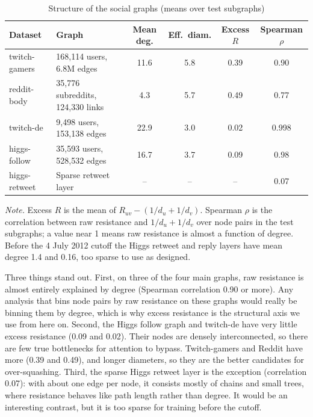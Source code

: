 \begin{table}[htbp]
\caption{Structure of the social graphs (means over test subgraphs)}
\label{tab:s0}
\centering\small
\begin{tabular}{@{}L{1.1in}L{1.45in}cccc@{}}
\toprule
Dataset & Graph & Mean deg. & Eff.\ diam. & Excess $R$ & Spearman $\rho$ \\
\midrule
twitch-gamers & 168,114 users, 6.8M edges & 11.6 & 5.8 & 0.39 & 0.90 \\
reddit-body & 35,776 subreddits, 124,330 links & 4.3 & 5.7 & 0.49 & 0.77 \\
twitch-de & 9,498 users, 153,138 edges & 22.9 & 3.0 & 0.02 & 0.998 \\
higgs-follow & 35,593 users, 528,532 edges & 16.7 & 3.7 & 0.09 & 0.98 \\
higgs-retweet & Sparse retweet layer & -- & -- & -- & 0.07 \\
\bottomrule
\end{tabular}

\vspace{4pt}
\parbox{0.92\textwidth}{\footnotesize\textit{Note.} Excess $R$ is the mean of $R_{uv}-(1/d_u+1/d_v)$. Spearman $\rho$ is the correlation between raw resistance and $1/d_u+1/d_v$ over node pairs in the test subgraphs; a value near 1 means raw resistance is almost a function of degree. Before the 4 July 2012 cutoff the Higgs retweet and reply layers have mean degree 1.4 and 0.16, too sparse to use as designed.}
\end{table}

Three things stand out. First, on three of the four main graphs, raw resistance is almost entirely explained by degree (Spearman correlation 0.90 or more). Any analysis that bins node pairs by raw resistance on these graphs would really be binning them by degree, which is why excess resistance is the structural axis we use from here on. Second, the Higgs follow graph and twitch-de have very little excess resistance (0.09 and 0.02). Their nodes are densely interconnected, so there are few true bottlenecks for attention to bypass. Twitch-gamers and Reddit have more (0.39 and 0.49), and longer diameters, so they are the better candidates for over-squashing. Third, the sparse Higgs retweet layer is the exception (correlation 0.07): with about one edge per node, it consists mostly of chains and small trees, where resistance behaves like path length rather than degree. It would be an interesting contrast, but it is too sparse for training before the cutoff.

